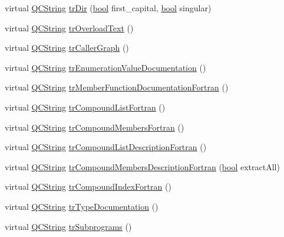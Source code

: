 \begin{DoxyCompactItemize}
\item 
virtual \hyperlink{class_q_c_string}{Q\+C\+String} \hyperlink{class_translator_croatian_a10a3224ece15bbb3004ae9ec02fc2335}{tr\+Dir} (\hyperlink{qglobal_8h_a1062901a7428fdd9c7f180f5e01ea056}{bool} first\+\_\+capital, \hyperlink{qglobal_8h_a1062901a7428fdd9c7f180f5e01ea056}{bool} singular)
\item 
virtual \hyperlink{class_q_c_string}{Q\+C\+String} \hyperlink{class_translator_croatian_a129d80bf2481e1195a1dcb2e44299b8d}{tr\+Overload\+Text} ()
\item 
virtual \hyperlink{class_q_c_string}{Q\+C\+String} \hyperlink{class_translator_croatian_ad00aca202061f70b8c307335009491d9}{tr\+Caller\+Graph} ()
\item 
virtual \hyperlink{class_q_c_string}{Q\+C\+String} \hyperlink{class_translator_croatian_a570d826f15efb5bda206077852bb439b}{tr\+Enumeration\+Value\+Documentation} ()
\item 
virtual \hyperlink{class_q_c_string}{Q\+C\+String} \hyperlink{class_translator_croatian_a35efefe1960664105587cb5521828c15}{tr\+Member\+Function\+Documentation\+Fortran} ()
\item 
virtual \hyperlink{class_q_c_string}{Q\+C\+String} \hyperlink{class_translator_croatian_aabd4494644ea85368800b6c746cb5c40}{tr\+Compound\+List\+Fortran} ()
\item 
virtual \hyperlink{class_q_c_string}{Q\+C\+String} \hyperlink{class_translator_croatian_ac363f07c47837a9ca20179b9fd164c35}{tr\+Compound\+Members\+Fortran} ()
\item 
virtual \hyperlink{class_q_c_string}{Q\+C\+String} \hyperlink{class_translator_croatian_a4e11f2481581e629cf456830eb73e5fe}{tr\+Compound\+List\+Description\+Fortran} ()
\item 
virtual \hyperlink{class_q_c_string}{Q\+C\+String} \hyperlink{class_translator_croatian_a49a09bde699d280d7c20502bfc906ca9}{tr\+Compound\+Members\+Description\+Fortran} (\hyperlink{qglobal_8h_a1062901a7428fdd9c7f180f5e01ea056}{bool} extract\+All)
\item 
virtual \hyperlink{class_q_c_string}{Q\+C\+String} \hyperlink{class_translator_croatian_a72bacf57e2216baa5c7952f805b68003}{tr\+Compound\+Index\+Fortran} ()
\item 
virtual \hyperlink{class_q_c_string}{Q\+C\+String} \hyperlink{class_translator_croatian_a00d80d36c26b46e2c01cba0e9c07d189}{tr\+Type\+Documentation} ()
\item 
virtual \hyperlink{class_q_c_string}{Q\+C\+String} \hyperlink{class_translator_croatian_af5a1ef3be00c4213e9f98f1064233407}{tr\+Subprograms} ()

\end{DoxyCompactItemize}
